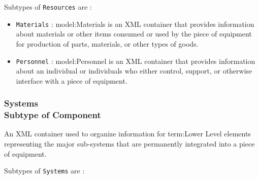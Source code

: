 Subtypes of \texttt{Resources} are : 

\begin{itemize}

\item \texttt{Materials} : {model:Materials} is an XML container that provides information about materials or other items consumed or used by the piece of equipment for production of parts, materials, or other types of goods.

\item \texttt{Personnel} : {model:Personnel} is an XML container that provides information about an individual or individuals who either control, support, or otherwise interface with a piece of equipment.


\end{itemize}

\FloatBarrier
\subsubsection[Systems]{Systems \\ {\small Subtype of Component}}
  \label{type:Systems}

\FloatBarrier

An XML container used to organize information for {term:Lower Level} elements representing the major sub-systems that are permanently integrated into a piece of equipment.

Subtypes of \texttt{Systems} are : 

